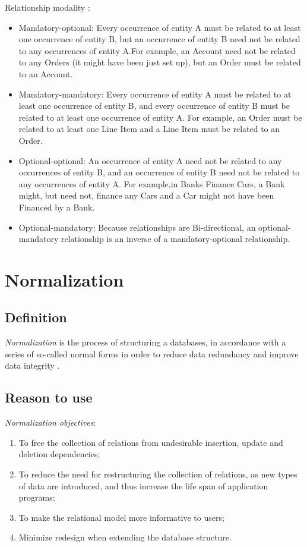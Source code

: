 Relationship modality \cite{medium-modality-cardinality}:

\begin{itemize}
    \item Mandatory-optional: Every occurrence of entity A must be related to at
        least one occurrence of entity B, but an occurrence of entity B need not be
        related to any occurrences of entity A.For example, an Account need not be
        related to any Orders (it might have been just set up), but an Order must be
        related to an Account.
    \item Mandatory-mandatory: Every occurrence of entity A
        must be related to at least one occurrence of entity B, and every occurrence
        of entity B must be related to at least one occurrence of entity A. For
        example, an Order must be related to at least one Line Item and a Line
        Item must be related to an Order.
    \item Optional-optional: An
        occurrence of entity A need not be related to any occurrences of
        entity B, and an occurrence of entity B need not be related to any
        occurrences of entity A. For example,in Banks Finance Cars, a Bank
        might, but need not, finance any Cars and a Car might not have been
        Financed by a Bank.
    \item Optional-mandatory: Because relationships
        are Bi-directional, an optional-mandatory relationship is an
        inverse of a mandatory-optional relationship.
\end{itemize}

\section{Normalization}

\subsection{Definition}
{\it Normalization} is the process of structuring a
databases, in accordance with a series of so-called normal forms in order to
reduce data redundancy and improve data integrity \cite{database-normalization}.

\subsection{Reason to use}
{\it Normalization objectives}:
\begin{enumerate}
    \item To free the collection of relations from undesirable insertion, update
        and deletion dependencies;
    \item To reduce the need for restructuring the collection of relations, as
        new types of data are introduced, and thus increase the life span of
        application programs;
    \item To make the relational model more informative to users;
    \item Minimize redesign when extending the database structure.
\end{enumerate}


